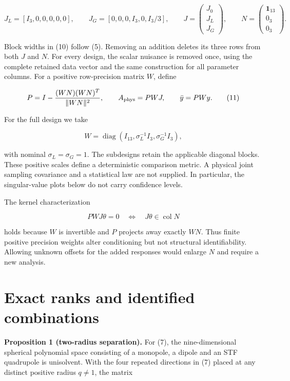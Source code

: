 \documentclass[aps,prd,preprint,onecolumn,notitlepage]{revtex4-2}
\begin{document}
\[
J_L=[I_3,0,0,0,0,0],\qquad
J_G=[0,0,0,I_3,0,I_3/3],\qquad
J=\begin{pmatrix}J_0\\J_L\\J_G\end{pmatrix},\qquad
N=\begin{pmatrix}\mathbf1_{13}\\0_3\\0_3\end{pmatrix}.       \tag{10}
\]

Block widths in (10) follow (5). Removing an addition deletes its three rows from both \(J\) and \(N\). For every design, the scalar nuisance is removed once, using the complete retained data vector and the same construction for all parameter columns. For a positive row-precision matrix \(W\), define

\[
P=I-{(WN)(WN)^T\over\|WN\|^2},\qquad
A_{\rm phys}=PWJ,\qquad \bar y=PWy.                     \tag{11}
\]

For the full design we take

\[
W=\operatorname{diag}(I_{13},\sigma_L^{-1}I_3,
                                    \sigma_G^{-1}I_3),    \tag{12}
\]

with nominal \(\sigma_L=\sigma_G=1\). The subdesigns retain the applicable diagonal blocks. These positive scales define a deterministic comparison metric. A physical joint sampling covariance and a statistical law are not supplied. In particular, the singular-value plots below do not carry confidence levels.

The kernel characterization

\[
PWJ\theta=0\quad\Longleftrightarrow\quad J\theta\in\operatorname{col}N
                                                               \tag{13}
\]

holds because \(W\) is invertible and \(P\) projects away exactly \(WN\). Thus finite positive precision weights alter conditioning but not structural identifiability. Allowing unknown offsets for the added responses would enlarge \(N\) and require a new analysis.

\hypertarget{exact-ranks-and-identified-combinations}{%
\section{Exact ranks and identified combinations}\label{exact-ranks-and-identified-combinations}}

\textbf{Proposition 1 (two-radius separation).} For (7), the nine-dimensional spherical polynomial space consisting of a monopole, a dipole and an STF quadrupole is unisolvent. With the four repeated directions in (7) placed at any distinct positive radius \(q\ne1\), the matrix
\end{document}

